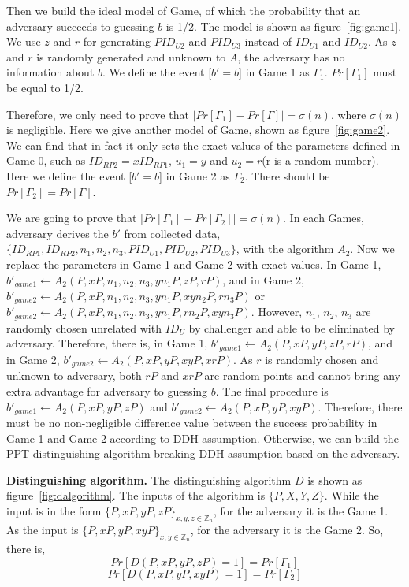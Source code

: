 Then we build the ideal model of Game, of which the probability  that an adversary succeeds to guessing $b$ is 1/2. The model is shown as figure~\ref{fig:game1}. We use $z$ and $r$ for generating $PID_{U2}$ and $PID_{U3}$ instead of $ID_{U1}$ and $ID_{U2}$. As $z$ and $r$ is randomly generated and unknown to $A$, the adversary has no information about $b$. We  define the event [$b'=b$] in Game 1 as $\Gamma_1$. $Pr[\Gamma_1]$ must be equal to 1/2. 

Therefore, we only need to prove that $|Pr[\Gamma_1]-Pr[\Gamma]|=\sigma(n)$, where $\sigma(n)$ is negligible. Here we give another model of Game, shown as figure~\ref{fig:game2}. We can find that in fact it only sets the exact values of the parameters defined in Game 0, such as $ID_{RP2}=xID_{RP1}$, $u_1=y$ and $u_2=r$(r is a random number).  Here we define the event [$b'=b$] in Game 2 as $\Gamma_2$. There should be $Pr[\Gamma_2]=Pr[\Gamma]$.

We are going to prove that $|Pr[\Gamma_1]-Pr[\Gamma_2]|=\sigma(n)$. In each Games, adversary derives the $b'$ from collected data, $\{ID_{RP1},ID_{RP2},n_1,n_2,n_3,PID_{U1},PID_{U2},PID_{U3}\}$, with the algorithm $A_2$. Now we replace the parameters in Game 1 and Game 2 with exact values. In Game 1, $b'_{game1}\gets A_2(P,xP,n_1,n_2,n_3,yn_1P,zP,rP)$, and in Game 2, $b'_{game2}\gets A_2(P,xP,n_1,n_2,n_3,yn_1P,xyn_2P,rn_3P)$ or $b'_{game2}\gets A_2(P,xP,n_1,n_2,n_3,yn_1P,rn_2P,xyn_3P)$. 
However, $n_1$, $n_2$, $n_3$ are randomly chosen unrelated with $ID_U$ by challenger and able to be eliminated by adversary. Therefore, there is, in Game 1, $b'_{game1}\gets A_2(P,xP,yP,zP,rP)$, and in Game 2, $b'_{game2}\gets A_2(P,xP,yP,xyP,xrP)$. As $r$ is randomly chosen and unknown to adversary, both $rP$ and $xrP$ are random points and cannot bring any extra advantage for adversary to guessing $b$.  The final procedure is $b'_{game1}\gets A_2(P,xP,yP,zP)$ and $b'_{game2}\gets A_2(P,xP,yP,xyP)$. Therefore, there must be no non-negligible difference value between the success probability in Game 1 and Game 2 according to DDH assumption. Otherwise, we can build the PPT distinguishing algorithm breaking DDH assumption based on the adversary. 

\noindent\textbf{Distinguishing algorithm.} The distinguishing algorithm $D$ is shown as figure~\ref{fig:dalgorithm}. 
The inputs of the algorithm is $\{P,X,Y,Z\}$. While the input is in the form $\{P,xP,yP,zP\}_{x,y,z \in \mathbb{Z}_n}$, for the adversary it is the Game 1. As the input is $\{P,xP,yP,xyP\}_{x,y \in \mathbb{Z}_n}$, for the adversary it is the Game 2. So, there is,
\begin{equation*}
   Pr[D(P,xP,yP,zP)=1]=Pr[{\Gamma_1}]
\end{equation*}
\begin{equation*}
   Pr[D(P,xP,yP,xyP)=1]=Pr[{\Gamma_2}]
\end{equation*}

